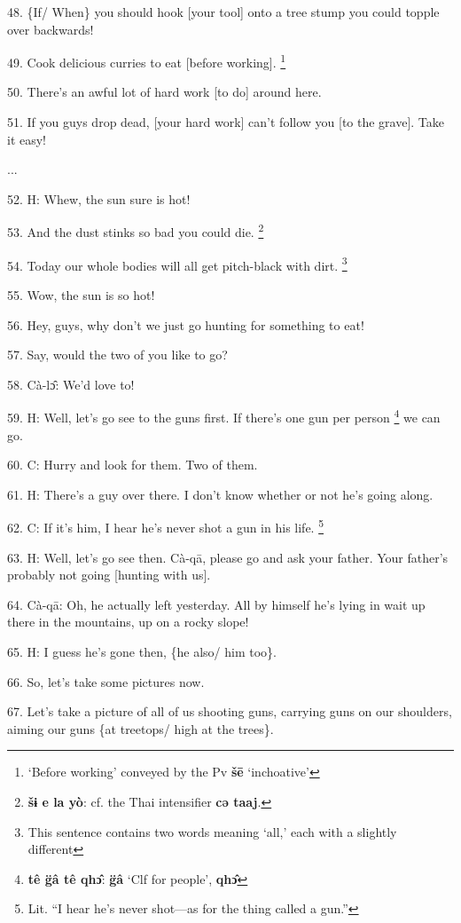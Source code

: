 {48. \{If/ When\} you should hook [your tool] onto a tree stump you could topple
over backwards!

49. Cook delicious curries to eat [before working]. \footnote{`Before working' conveyed by the Pv \textbf{šē }`inchoative'}

50. There's an awful lot of hard work [to do] around here.

51. If you guys drop dead, [your hard work] can't follow you [to the grave]. Take
it easy!

...

52. H: Whew, the sun sure is hot!

53. And the dust stinks so bad you could die. \footnote{\textbf{šɨ e la yò}: cf. the Thai intensifier \textbf{cə taaj}.}

54. Today our whole bodies will all get pitch-black with dirt. \footnote{This sentence contains two words meaning `all,' each with a slightly different}

55. Wow, the sun is so hot!

56. Hey, guys, why don't we just go hunting for something to eat!

57. Say, would the two of you like to go?

58. Cà-lɔ̂: We'd love to!

59. H: Well, let's go see to the guns first. If there's one gun per person \footnote{\textbf{tê g̈â tê qhɔ̂}:\textbf{ g̈â} `Clf for people', \textbf{qhɔ̂}}
we can go.

60. C: Hurry and look for them. Two of them.

61. H: There's a guy over there. I don't know whether or not he's going along.

62. C: If it's him, I hear he's never shot a gun in his life. \footnote{Lit. ``I hear he's never shot---as for the thing called a gun.''}

63. H: Well, let's go see then. Cà-qā, please go and ask your father. Your father's
probably not going [hunting with us].

64. Cà-qā: Oh, he actually left yesterday. All by himself he's lying in wait
up there in the mountains, up on a rocky slope!

65. H: I guess he's gone then, \{he also/ him too\}.

66. So, let's take some pictures now.

67. Let's take a picture of all of us shooting guns, carrying guns on our shoulders,
aiming our guns \{at treetops/ high at the trees\}.

}
